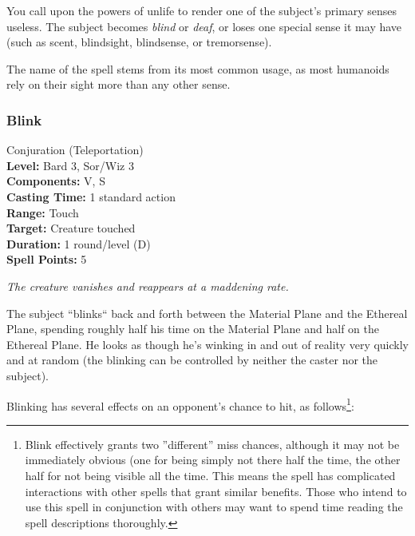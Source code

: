 You call upon the powers of unlife to render one of the subject's primary senses useless.
The subject becomes \emph{blind} or \emph{deaf}, or loses one special sense it may have (such as scent, blindsight, blindsense, or tremorsense). 

The name of the spell stems from its most common usage, as most humanoids rely on their sight more than any other sense.


\subsubsection{Blink}
\label{Spell:Blink}
Conjuration (Teleportation)
\\ \textbf{Level:} Bard 3, Sor/Wiz 3
\\ \textbf{Components:} V, S
\\ \textbf{Casting Time:} 1 standard action
\\ \textbf{Range:} Touch
\\ \textbf{Target:} Creature touched
\\ \textbf{Duration:} 1 round/level (D)
\\ \textbf{Spell Points:} 5

\emph{The creature vanishes and reappears at a maddening rate.}

The subject ``blinks`` back and forth between the Material Plane and the Ethereal Plane, spending
roughly half his time on the Material Plane and half on the Ethereal Plane. 
He looks as though he's winking in and out of reality very quickly and at random
(the blinking can be controlled by neither the caster nor the subject).

Blinking has several effects on an opponent's chance to hit, as follows\footnote{
Blink effectively grants two ''different'' miss chances, although it may not be immediately obvious
(one for being simply not there half the time, the other half for not being visible all the time.
This means the spell has complicated interactions with other spells that grant similar benefits. 
Those who intend to use this spell in conjunction with others may want to spend time reading the spell descriptions thoroughly.
}:

